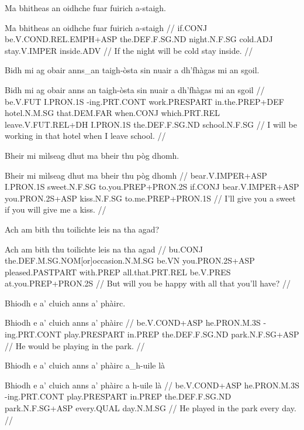 \documentclass[a4paper,10pt]{article}
\begin{document}
\ex
\begingl
\glpre Ma bhitheas an oidhche fuar fuirich a-staigh. 

\vspace{4mm}
\gla Ma bhitheas an oidhche fuar fuirich a-staigh  //
\glb if.CONJ be.V.COND.REL.EMPH+ASP the.DEF.F.SG.ND night.N.F.SG cold.ADJ stay.V.IMPER inside.ADV  //
\glft If the night will be cold stay inside. //
\endgl
\xe

\ex
\begingl
\glpre Bidh mi ag obair anns\_an taigh-òsta sin nuair a dh'fhàgas mi an sgoil. 

\vspace{4mm}
\gla Bidh mi ag obair {anns an} taigh-òsta sin nuair a dh'fhàgas mi an sgoil  //
\glb be.V.FUT I.PRON.1S -ing.PRT.CONT work.PRESPART in.the.PREP+DEF hotel.N.M.SG that.DEM.FAR when.CONJ which.PRT.REL leave.V.FUT.REL+DH I.PRON.1S the.DEF.F.SG.ND school.N.F.SG  //
\glft I will be working in that hotel when I leave school. //
\endgl
\xe

\ex
\begingl
\glpre Bheir mi mìlseag dhut ma bheir thu pòg dhomh. 

\vspace{4mm}
\gla Bheir mi mìlseag dhut ma bheir thu pòg dhomh  //
\glb bear.V.IMPER+ASP I.PRON.1S sweet.N.F.SG to.you.PREP+PRON.2S if.CONJ bear.V.IMPER+ASP you.PRON.2S+ASP kiss.N.F.SG to.me.PREP+PRON.1S  //
\glft I'll give you a sweet if you will give me a kiss. //
\endgl
\xe

\ex
\begingl
\glpre Ach am bith thu toilichte leis na tha agad? 

\vspace{4mm}
\gla Ach am bith thu toilichte leis na tha agad  //
\glb bu.CONJ the.DEF.M.SG.NOM[or]occasion.N.M.SG be.VN you.PRON.2S+ASP pleased.PASTPART with.PREP all.that.PRT.REL be.V.PRES at.you.PREP+PRON.2S  //
\glft But will you be happy with all that you'll have? //
\endgl
\xe

\ex
\begingl
\glpre Bhiodh e a' cluich anns a' phàirc. 

\vspace{4mm}
\gla Bhiodh e a' cluich anns a' phàirc  //
\glb be.V.COND+ASP he.PRON.M.3S -ing.PRT.CONT play.PRESPART in.PREP the.DEF.F.SG.ND park.N.F.SG+ASP  //
\glft He would be playing in the park. //
\endgl
\xe

\ex
\begingl
\glpre Bhiodh e a' cluich anns a' phàirc a\_h-uile là 

\vspace{4mm}
\gla Bhiodh e a' cluich anns a' phàirc {a h-uile} là  //
\glb be.V.COND+ASP he.PRON.M.3S -ing.PRT.CONT play.PRESPART in.PREP the.DEF.F.SG.ND park.N.F.SG+ASP every.QUAL day.N.M.SG  //
\glft He played in the park every day. //
\endgl
\xe
\end{document}
